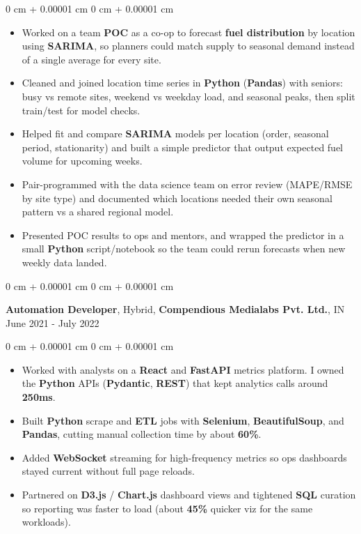 \documentclass[10pt, letterpaper]{article}
\newenvironment{highlights}{
    \begin{itemize}[
        topsep=0.10 cm,
        parsep=0.10 cm,
        partopsep=0pt,
        itemsep=0pt,
        leftmargin=0 cm + 10pt
    ]
}{
    \end{itemize}
} %
\newenvironment{onecolentry}{
    \begin{adjustwidth}{
        0 cm + 0.00001 cm
    }{
        0 cm + 0.00001 cm
    }
}{
    \end{adjustwidth}
} %
\newcommand{\resumeheading}[2]{%
    \begin{onecolentry}
        #1 \hfill #2
    \end{onecolentry}
} %
\begin{document}
\begin{onecolentry}
\begin{highlights}
	\item Worked on a team \textbf{POC} as a co-op to forecast \textbf{fuel distribution} by location using \textbf{SARIMA}, so planners could match supply to seasonal demand instead of a single average for every site.
	\item Cleaned and joined location time series in \textbf{Python} (\textbf{Pandas}) with seniors: busy vs remote sites, weekend vs weekday load, and seasonal peaks, then split train/test for model checks.
	\item Helped fit and compare \textbf{SARIMA} models per location (order, seasonal period, stationarity) and built a simple predictor that output expected fuel volume for upcoming weeks.
	\item Pair-programmed with the data science team on error review (MAPE/RMSE by site type) and documented which locations needed their own seasonal pattern vs a shared regional model.
	\item Presented POC results to ops and mentors, and wrapped the predictor in a small \textbf{Python} script/notebook so the team could rerun forecasts when new weekly data landed.
\end{highlights}
\end{onecolentry}




\vspace{0.15 cm}
\resumeheading{\textbf{Automation Developer}, Hybrid, \textbf{Compendious Medialabs Pvt. Ltd.}, IN}{June 2021 - July 2022}

\begin{onecolentry}
\begin{highlights}
	\item Worked with analysts on a \textbf{React} and \textbf{FastAPI} metrics platform. I owned the \textbf{Python} APIs (\textbf{Pydantic}, \textbf{REST}) that kept analytics calls around \textbf{250ms}.
	\item Built \textbf{Python} scrape and \textbf{ETL} jobs with \textbf{Selenium}, \textbf{BeautifulSoup}, and \textbf{Pandas}, cutting manual collection time by about \textbf{60\%}.
	\item Added \textbf{WebSocket} streaming for high-frequency metrics so ops dashboards stayed current without full page reloads.
	\item Partnered on \textbf{D3.js} / \textbf{Chart.js} dashboard views and tightened \textbf{SQL} curation so reporting was faster to load (about \textbf{45\%} quicker viz for the same workloads).
\end{highlights}
\end{onecolentry}
\end{document}
